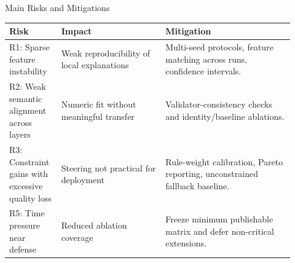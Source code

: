 \begin{frame}{Main Risks and Mitigations}
    \small
    \begin{table}
        \centering
        \begin{tabular}{@{}p{0.16\linewidth}p{0.34\linewidth}p{0.42\linewidth}@{}}
            \toprule
            \textbf{Risk} & \textbf{Impact} & \textbf{Mitigation} \\
            \midrule
            R1: Sparse feature instability &
            Weak reproducibility of local explanations &
            Multi-seed protocols, feature matching across runs, confidence intervals. \\
            \addlinespace[0.25em]
            R2: Weak semantic alignment across layers &
            Numeric fit without meaningful transfer &
            Validator-consistency checks and identity/baseline ablations. \\
            \addlinespace[0.25em]
            R3: Constraint gains with excessive quality loss &
            Steering not practical for deployment &
            Rule-weight calibration, Pareto reporting, unconstrained fallback baseline. \\
            \addlinespace[0.25em]
            R5: Time pressure near defense &
            Reduced ablation coverage &
            Freeze minimum publishable matrix and defer non-critical extensions. \\
            \bottomrule
        \end{tabular}
    \end{table}
\end{frame}

